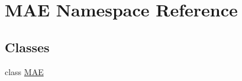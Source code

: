 \hypertarget{namespace_m_a_e}{}\section{M\+AE Namespace Reference}
\label{namespace_m_a_e}
\subsection*{Classes}
\begin{DoxyCompactItemize}
\item 
class \mbox{\hyperlink{class_m_a_e_1_1_m_a_e}{M\+AE}}
\end{DoxyCompactItemize}
